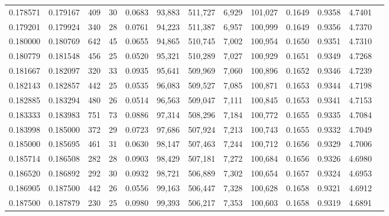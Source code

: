 \begin{tabular}{rrrrrrrrrrrrr}
0.178571 & 0.179167 &    409 &    30 &                                     0.0683 &  93,883 & 511,727 &   6,929 & 101,027 & 0.1649 & 0.9358 & 4.7401 \\
0.179201 & 0.179924 &    340 &    28 &                                     0.0761 &  94,223 & 511,387 &   6,957 & 100,999 & 0.1649 & 0.9356 & 4.7370 \\
0.180000 & 0.180769 &    642 &    45 &                                     0.0655 &  94,865 & 510,745 &   7,002 & 100,954 & 0.1650 & 0.9351 & 4.7310 \\
0.180779 & 0.181548 &    456 &    25 &                                     0.0520 &  95,321 & 510,289 &   7,027 & 100,929 & 0.1651 & 0.9349 & 4.7268 \\
0.181667 & 0.182097 &    320 &    33 &                                     0.0935 &  95,641 & 509,969 &   7,060 & 100,896 & 0.1652 & 0.9346 & 4.7239 \\
0.182143 & 0.182857 &    442 &    25 &                                     0.0535 &  96,083 & 509,527 &   7,085 & 100,871 & 0.1653 & 0.9344 & 4.7198 \\
0.182885 & 0.183294 &    480 &    26 &                                     0.0514 &  96,563 & 509,047 &   7,111 & 100,845 & 0.1653 & 0.9341 & 4.7153 \\
0.183333 & 0.183983 &    751 &    73 &                                     0.0886 &  97,314 & 508,296 &   7,184 & 100,772 & 0.1655 & 0.9335 & 4.7084 \\
0.183998 & 0.185000 &    372 &    29 &                                     0.0723 &  97,686 & 507,924 &   7,213 & 100,743 & 0.1655 & 0.9332 & 4.7049 \\
0.185000 & 0.185695 &    461 &    31 &                                     0.0630 &  98,147 & 507,463 &   7,244 & 100,712 & 0.1656 & 0.9329 & 4.7006 \\
0.185714 & 0.186508 &    282 &    28 &                                     0.0903 &  98,429 & 507,181 &   7,272 & 100,684 & 0.1656 & 0.9326 & 4.6980 \\
0.186520 & 0.186892 &    292 &    30 &                                     0.0932 &  98,721 & 506,889 &   7,302 & 100,654 & 0.1657 & 0.9324 & 4.6953 \\
0.186905 & 0.187500 &    442 &    26 &                                     0.0556 &  99,163 & 506,447 &   7,328 & 100,628 & 0.1658 & 0.9321 & 4.6912 \\
0.187500 & 0.187879 &    230 &    25 &                                     0.0980 &  99,393 & 506,217 &   7,353 & 100,603 & 0.1658 & 0.9319 & 4.6891 \\

\end{tabular}
